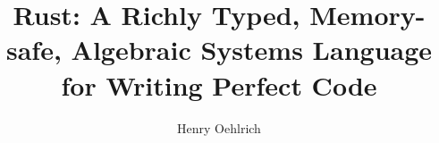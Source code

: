 \documentclass{article}
\title{Rust: A Richly Typed, Memory-safe, Algebraic Systems Language for Writing Perfect Code}
\author{Henry Oehlrich}
\begin{document}
\maketitle{}

\cite{rustforrustaceans}
\cite{rust-lang.org}
\cite{rust-by-example}
\cite{the-c-programming-language}
\cite{noboilerplate}


 
\end{document}
